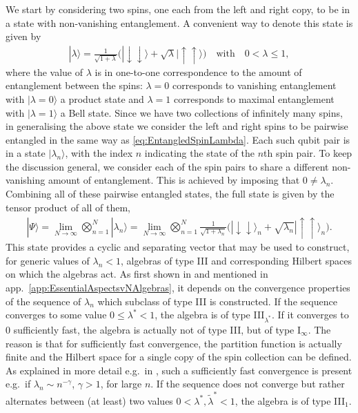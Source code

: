 \documentclass[a4paper,11pt]{article}
\newcommand{\1}{\mathds{1}}
\begin{document}
We start by considering two spins, one each from the left and right copy, to be in a state with non-vanishing entanglement. A convenient way to denote this state is given by
\begin{align}
    |\lambda\rangle=\frac{1}{\sqrt{1+\lambda}}\big(|\!\downarrow\downarrow\rangle+\sqrt{\lambda}|\!\uparrow\uparrow\rangle\big)\quad\text{with}\quad0<\lambda\leq1,\label{eq:EntangledSpinLambda}
\end{align}
where the value of $\lambda$ is in one-to-one correspondence to the amount of entanglement between the spins: $\lambda=0$ corresponds to vanishing entanglement with $|\lambda=0\rangle$ a product state and $\lambda=1$ corresponds to maximal entanglement with $|\lambda=1\rangle$ a Bell state. Since we have two collections of infinitely many spins, in generalising the above state we consider the left and right spins to be pairwise entangled in the same way as \eqref{eq:EntangledSpinLambda}. Each such qubit pair is in a state $|\lambda_n\rangle$, with the index $n$ indicating the state of the $n$th spin pair. To keep the discussion general, we consider each of the spin pairs to share a different non-vanishing amount of entanglement. This is achieved by imposing that $0\neq\lambda_n$. Combining all of these pairwise entangled states, the full state is given by the tensor product of all of them,
\begin{align}
    |\Psi\rangle=\lim\limits_{N\to\infty}\bigotimes_{n=1}^N|\lambda_n\rangle=\lim\limits_{N\to\infty}\bigotimes_{n=1}^N\frac{1}{\sqrt{1+\lambda_n}}\big(|\!\downarrow\downarrow\rangle_n+\sqrt{\lambda_n}|\!\uparrow\uparrow\rangle_n\big).\label{eq:CyclicSeparatingArakiWoods}
\end{align}
This state provides a cyclic and separating vector that may be used to construct, for generic values of $\lambda_n<1$, algebras of type III and corresponding Hilbert spaces on which the algebras act. As first shown in \cite{araki1968classification} and mentioned  in app.~\ref{app:EssentialAspectsvNAlgebras}, it depends on the convergence properties of the sequence of $\lambda_n$ which subclass of type III is constructed. If the sequence converges to some value $0\leq\lambda^\ast<1$, the algebra is of type III$_{\lambda^\ast}$. If it converges to $0$ sufficiently fast, the algebra is actually not of type III, but of type I$_\infty$. The reason is that for sufficiently fast convergence, the partition function is actually finite and the Hilbert space for a single copy of the spin collection can be defined. As explained in more detail e.g.~in \cite{Witten:2021jzq}, such a sufficiently fast convergence is present e.g.~if $\lambda_n\sim n^{-\gamma}$, $\gamma>1$, for large $n$. If the sequence does not converge but rather alternates between (at least) two values $0<\lambda^\ast,\tilde{\lambda}^\ast<1$, the algebra is of type III$_1$.
\end{document}

